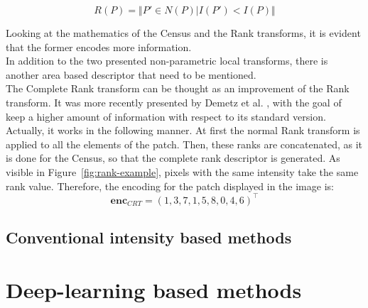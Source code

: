 \begin{equation}
	\label{eqn:rank-transform}
	R(P) = \Vert {P' \in N(P) \vert I(P') < I(P)} \Vert	
\end{equation}

Looking at the mathematics of the Census and the Rank transforms, it is evident that the former encodes more information. \\
In addition to the two presented non-parametric local transforms, there is another area based descriptor that need to be mentioned.\\
The Complete Rank transform can be thought as an improvement of the Rank transform.
It was more recently presented by Demetz et al. \cite{Demetz2013}, with the goal of keep a higher amount of information with respect to its standard version.
Actually, it works in the following manner.
At first the normal Rank transform is applied to all the elements of the patch. 
Then, these ranks are concatenated, as it is done for the Census, so that the complete rank descriptor is generated.  
As visible in Figure~\ref{fig:rank-example}, pixels with the same intensity take the same rank value. 
Therefore, the encoding for the patch displayed in the image is:
\begin{equation}
	\label{eqn:complete-rank-encoding}
	\mathbf{enc}_{CRT} = (1, 3, 7, 1, 5, 8, 0, 4, 6)^\top
\end{equation}

\subsection{Conventional intensity based methods}
\label{subsection:conventional-methods}

\section{Deep-learning based methods}
\label{section:deep-learning-method}

